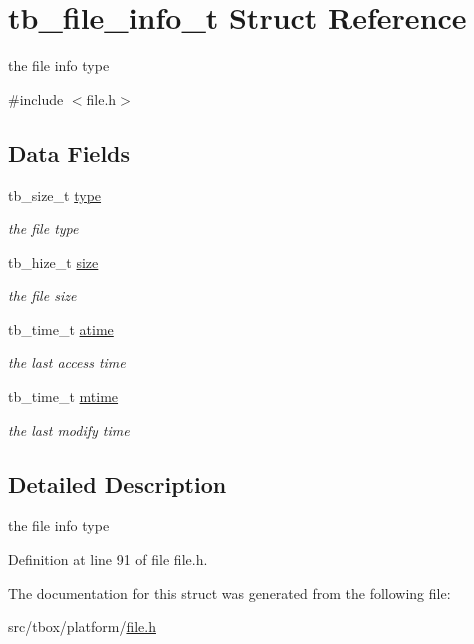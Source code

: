 \hypertarget{structtb__file__info__t}{\section{tb\-\_\-file\-\_\-info\-\_\-t Struct Reference}
\label{structtb__file__info__t}
}


the file info type  




{\ttfamily \#include $<$file.\-h$>$}

\subsection*{Data Fields}
\begin{DoxyCompactItemize}
\item 
\hypertarget{structtb__file__info__t_ad2c9bcfa8a9d042a87ecfbee8a53b93a}{tb\-\_\-size\-\_\-t \hyperlink{structtb__file__info__t_ad2c9bcfa8a9d042a87ecfbee8a53b93a}{type}}\label{structtb__file__info__t_ad2c9bcfa8a9d042a87ecfbee8a53b93a}

\begin{DoxyCompactList}\small\item\em the file type \end{DoxyCompactList}\item 
\hypertarget{structtb__file__info__t_ab3ec7e8898d7f433d8f9cf89981b5bef}{tb\-\_\-hize\-\_\-t \hyperlink{structtb__file__info__t_ab3ec7e8898d7f433d8f9cf89981b5bef}{size}}\label{structtb__file__info__t_ab3ec7e8898d7f433d8f9cf89981b5bef}

\begin{DoxyCompactList}\small\item\em the file size \end{DoxyCompactList}\item 
\hypertarget{structtb__file__info__t_a0240cf0430b85de4221db51aecacc34b}{tb\-\_\-time\-\_\-t \hyperlink{structtb__file__info__t_a0240cf0430b85de4221db51aecacc34b}{atime}}\label{structtb__file__info__t_a0240cf0430b85de4221db51aecacc34b}

\begin{DoxyCompactList}\small\item\em the last access time \end{DoxyCompactList}\item 
\hypertarget{structtb__file__info__t_aa8a5633766a9eaa02767c2615c7033c0}{tb\-\_\-time\-\_\-t \hyperlink{structtb__file__info__t_aa8a5633766a9eaa02767c2615c7033c0}{mtime}}\label{structtb__file__info__t_aa8a5633766a9eaa02767c2615c7033c0}

\begin{DoxyCompactList}\small\item\em the last modify time \end{DoxyCompactList}\end{DoxyCompactItemize}


\subsection{Detailed Description}
the file info type 

Definition at line 91 of file file.\-h.



The documentation for this struct was generated from the following file\-:\begin{DoxyCompactItemize}
\item 
src/tbox/platform/\hyperlink{file_8h}{file.\-h}\end{DoxyCompactItemize}
